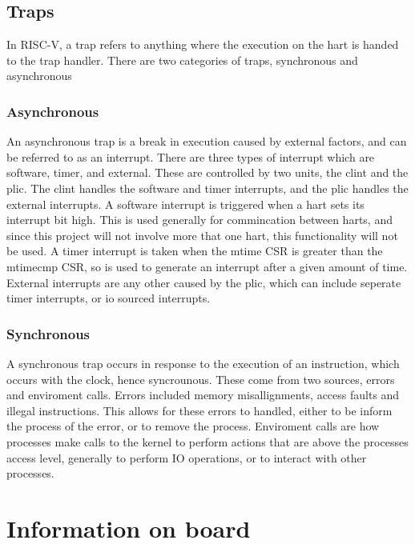 \subsection{Traps}
In RISC-V, a trap refers to anything where the execution on the hart is handed to the trap handler. There are two categories of traps, synchronous and asynchronous
\subsubsection{Asynchronous}
An asynchronous trap is a break in execution caused by external factors, and can be referred to as an interrupt. There are three types of interrupt which are software, timer, and external. These are controlled by two units, the \ac{clint} and the \ac{plic}. The \ac{clint} handles the software and timer interrupts, and the \ac{plic} handles the external interrupts. A software interrupt is triggered when a hart sets its interrupt bit high. This is used generally for commincation between harts, and since this project will not involve more that one hart, this functionality will not be used. A timer interrupt is taken when the mtime CSR is greater than the mtimecmp CSR, so is used to generate an interrupt after a given amount of time. External interrupts are any other caused by the \ac{plic}, which can include seperate timer interrupts, or \ac{io} sourced interrupts.
\subsubsection{Synchronous}
A synchronous trap occurs in response to the execution of an instruction, which occurs with the clock, hence syncrounous. These come from two sources, errors and enviroment calls. Errors included memory misallignments, access faults and illegal instructions. This allows for these errors to handled, either to be inform the process of the error, or to remove the process. Enviroment calls are how processes make calls to the kernel to perform actions that are above the processes access level, generally to perform IO operations, or to interact with other processes.
\section{Information on board}